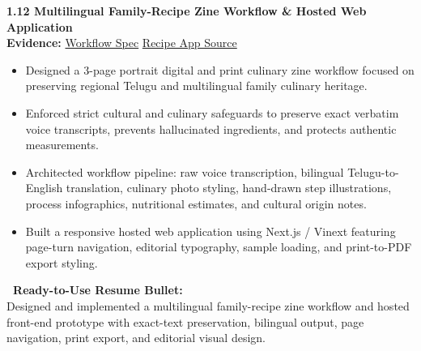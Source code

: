 \documentclass[10pt,a4paper]{article}
\newcommand{\statusprototype}{\tcbox[on line, colback=prototypebg, colframe=prototype!50!white, size=small, arc=2pt, boxrule=0.5pt]{\scriptsize\bfseries\color{prototype}\faIcon{flask}\ PROTOTYPE / PARTIAL}}
\begin{document}
\begin{projectcard}
  \textbf{\large 1.12 Multilingual Family-Recipe Zine Workflow \& Hosted Web Application} \hfill \statusprototype\\[2pt]
  {\footnotesize\color{textmuted}\textbf{Evidence:} \underline{Workflow Spec} \quad\textbar\quad \underline{Recipe App Source}}
  \begin{itemize}[leftmargin=14pt, itemsep=1.5pt, topsep=2pt]
    \item Designed a 3-page portrait digital and print culinary zine workflow focused on preserving regional Telugu and multilingual family culinary heritage.
    \item Enforced strict cultural and culinary safeguards to preserve exact verbatim voice transcripts, prevents hallucinated ingredients, and protects authentic measurements.
    \item Architected workflow pipeline: raw voice transcription, bilingual Telugu-to-English translation, culinary photo styling, hand-drawn step illustrations, process infographics, nutritional estimates, and cultural origin notes.
    \item Built a responsive hosted web application using Next.js / Vinext featuring page-turn navigation, editorial typography, sample loading, and print-to-PDF export styling.
  \end{itemize}
  \begin{resumebox}
    \textbf{\color{accent}\ Ready-to-Use Resume Bullet:}\\
    Designed and implemented a multilingual family-recipe zine workflow and hosted front-end prototype with exact-text preservation, bilingual output, page navigation, print export, and editorial visual design.
  \end{resumebox}
\end{projectcard}

\newpage
\end{document}
